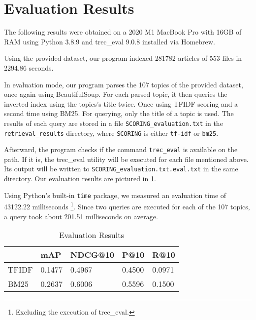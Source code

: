 \section{Evaluation Results}
\label{sec:results}

The following results were obtained on a 2020 M1 MacBook Pro with 16GB of RAM using Python 3.8.9 and trec\_eval 9.0.8 installed via Homebrew.

\medskip

Using the provided dataset, our program indexed 281782 articles of 553 files in 2294.86 seconds.

\medskip

In evaluation mode, our program parses the 107 topics of the provided dataset, once again using BeautifulSoup.
For each parsed topic, it then queries the inverted index using the topics's title twice.
Once using TFIDF scoring and a second time using BM25.
For querying, only the title of a topic is used.
The results of each query are stored in a file \verb|SCORING_evaluation.txt| in the \verb|retrieval_results| directory, where \verb|SCORING| is either \verb|tf-idf| or \verb|bm25|.

Afterward, the program checks if the command \verb|trec_eval| is available on the path.
If it is, the trec\_eval utility will be executed for each file mentioned above.
Its output will be written to \verb|SCORING_evaluation.txt.eval.txt| in the same directory.
Our evaluation results are pictured in \cref{table:results}.

Using Python's built-in \verb|time| package, we measured an evaluation time of 43122.22 milliseconds \footnote{Excluding the execution of trec\_eval.}.
Since two queries are executed for each of the 107 topics, a query took about 201.51 milliseconds on average.

\begin{table}[]
\center
\begin{tabular}{|l|l|l|l|l|}
	\hline
	      & mAP    & NDCG@10 & P@10   & R@10   \\
	\hline
	TFIDF & 0.1477 & 0.4967  & 0.4500 & 0.0971 \\
	\hline
	BM25  & 0.2637 & 0.6006  & 0.5596 & 0.1500 \\
	\hline
\end{tabular}
\caption{Evaluation Results}
\label{table:results}
\end{table}
